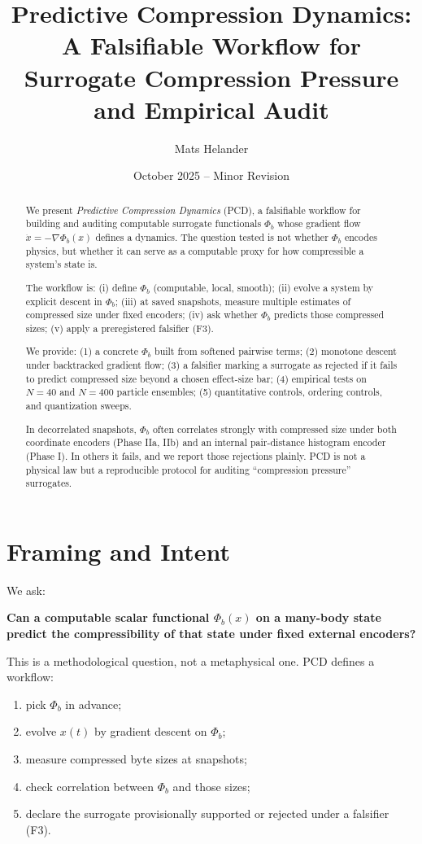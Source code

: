 \documentclass[11pt,a4paper]{article}
\title{\bf Predictive Compression Dynamics:\\
A Falsifiable Workflow for Surrogate Compression Pressure and Empirical Audit}
\author{Mats Helander}
\date{October 2025 -- Minor Revision}
\numberwithin{equation}{section}
\newcommand{\phib}{\Phi_b}
\begin{document}
\maketitle

\begin{abstract}
We present \emph{Predictive Compression Dynamics} (PCD), a falsifiable workflow for building and auditing computable surrogate functionals $\phib$ whose gradient flow $\dot x = -\nabla \phib(x)$ defines a dynamics. The question tested is not whether $\phib$ encodes physics, but whether it can serve as a computable proxy for how compressible a system's state is.

The workflow is: (i) define $\phib$ (computable, local, smooth); (ii) evolve a system by explicit descent in $\phib$; (iii) at saved snapshots, measure multiple estimates of compressed size under fixed encoders; (iv) ask whether $\phib$ predicts those compressed sizes; (v) apply a preregistered falsifier (F3).

We provide: (1) a concrete $\phib$ built from softened pairwise terms; (2) monotone descent under backtracked gradient flow; (3) a falsifier marking a surrogate as rejected if it fails to predict compressed size beyond a chosen effect-size bar; (4) empirical tests on $N{=}40$ and $N{=}400$ particle ensembles; (5) quantitative controls, ordering controls, and quantization sweeps.

In decorrelated snapshots, $\phib$ often correlates strongly with compressed size under both coordinate encoders (Phase IIa, IIb) and an internal pair-distance histogram encoder (Phase I). In others it fails, and we report those rejections plainly. PCD is not a physical law but a reproducible protocol for auditing ``compression pressure'' surrogates.
\end{abstract}

\section{Framing and Intent}
We ask:

\textbf{Can a computable scalar functional $\phib(x)$ on a many-body state predict the compressibility of that state under fixed external encoders?}

This is a methodological question, not a metaphysical one. PCD defines a workflow:

\begin{enumerate}[label=(\roman*)]
\item pick $\phib$ in advance;
\item evolve $x(t)$ by gradient descent on $\phib$;
\item measure compressed byte sizes at snapshots;
\item check correlation between $\phib$ and those sizes;
\item declare the surrogate provisionally supported or rejected under a falsifier (F3).
\end{enumerate}
\end{document}
